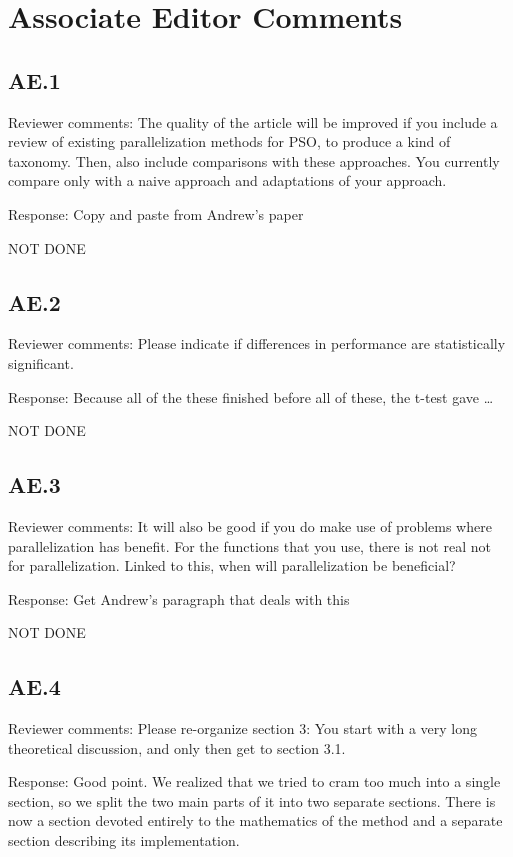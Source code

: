 \documentclass[onecolumn, 12pt]{article}
\begin{document}
\section*{Associate Editor Comments}

\subsection*{AE.1}

Reviewer comments: The quality of the article will be improved if you include a
review of existing parallelization methods for PSO, to produce a kind of
taxonomy. Then, also include comparisons with these approaches. You currently
compare only with a naive approach and adaptations of your approach.

Response: Copy and paste from Andrew's paper

NOT DONE

\subsection*{AE.2}

Reviewer comments: Please indicate if differences in performance are
statistically significant.

Response: Because all of the these finished before all of these, the t-test
gave \ldots

NOT DONE

\subsection*{AE.3}

Reviewer comments: It will also be good if you do make use of problems where
parallelization has benefit. For the functions that you use, there is not real
not for parallelization. Linked to this, when will parallelization be
beneficial?

Response: Get Andrew's paragraph that deals with this

NOT DONE

\subsection*{AE.4}

Reviewer comments: Please re-organize section 3: You start with a very long
theoretical discussion, and only then get to section 3.1.

Response: Good point.  We realized that we tried to cram too much into a single
section, so we split the two main parts of it into two separate sections.
There is now a section devoted entirely to the mathematics of the method and a
separate section describing its implementation.
\end{document}
